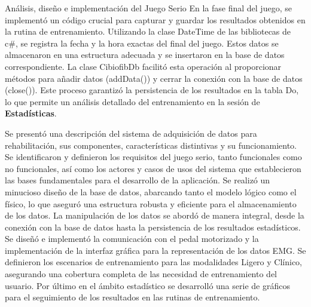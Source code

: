 \begin{thesischapter}{2} {Análisis, diseño e implementación del Juego Serio}
    En la fase final del juego, se implementó un código crucial para capturar y guardar los resultados obtenidos en la rutina de entrenamiento. Utilizando la clase DateTime de las bibliotecas de c\#, 
    se registra la fecha y la hora exactas del final del juego. Estos datos se almacenaron en una estructura adecuada y se insertaron en la base de datos correspondiente. La clase CibiofibDb facilitó esta 
    operación al proporcionar métodos para añadir datos (addData()) y cerrar la conexión con la base de datos (close()). Este proceso garantizó la persistencia de los resultados en la tabla Do, lo que 
    permite un análisis detallado del entrenamiento en la sesión de \textbf{Estadísticas}.



    Se presentó una descripción del sistema de adquisición de datos para rehabilitación, sus componentes,
    características distintivas y su funcionamiento. Se identificaron y definieron los requisitos del juego 
    serio, tanto funcionales como no funcionales, así como los actores y casos de usos del sistema que establecieron 
    las bases fundamentales para el desarrollo de la aplicación. Se realizó un minucioso diseño de la base de datos, 
    abarcando tanto el modelo lógico como el físico, lo que aseguró una estructura robusta y eficiente para el 
    almacenamiento de los datos. La manipulación de los datos se abordó de manera integral, desde la conexión con 
    la base de datos hasta la persistencia de los resultados estadísticos. Se diseñó e implementó la comunicación
    con el pedal motorizado y la implementación de la interfaz gráfica para la representación de los datos EMG. 
    Se definieron los escenarios de entrenamiento para las modalidades Ligero y Clínico, asegurando 
    una cobertura completa de las necesidad de entrenamiento del usuario. Por último en el ámbito estadístico se desarrolló 
    una serie de gráficos para el seguimiento de los resultados en las rutinas de entrenamiento.   
    

\end{thesischapter}